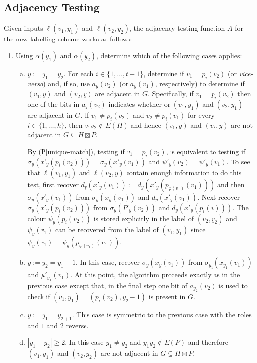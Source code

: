\documentclass{patmorin}
\newcommand{\pref}[1]{(P\ref{#1})}
\begin{document}
\subsection{Adjacency Testing}

Given inputs $\ell(v_1,y_1)$ and $\ell(v_2,y_2)$, the adjacency testing function $A$ for the new labelling scheme works as follows:
\begin{enumerate}
    \item Using $\alpha(y_1)$ and $\alpha(y_2)$, determine which of the following cases applies:
    \begin{enumerate}[(a)]
        \item $y:=y_1=y_2$.  For each $i\in\{1,\ldots,t+1\}$, determine if $v_1=p_i(v_2)$ (or \textit{vice-versa}) and, if so, use $a_y(v_2)$ (or $a_y(v_1)$, respectively) to determine if $(v_1,y)$ and $(v_2,y)$ are adjacent in $G$. Specifically, if $v_1=p_i(v_2)$ then one of the bits in $a_y(v_2)$ indicates whether or $(v_1,y_1)$ and $(v_2,y_1)$ are adjacent in $G$. If $v_1\neq p_i(v_2)$ and $v_2\neq p_i(v_1)$ for every $i\in\{1,\ldots,h\}$, then $v_1v_2\not\in E(H)$ and hence $(v_1,y)$ and $(v_2,y)$ are not adjacent in $G\subseteq H\boxtimes P$.

        By \pref{unique-match}, testing if $v_1=p_i(v_2)$, is equivalent to testing if $\sigma_y(x'_y(p_i(v_2)))=\sigma_y(x'_y(v_1))$ and $\psi'_y(v_2)=\psi'_y(v_1)$.  To see that $\ell(v_1,y_1)$ and $\ell(v_2,y)$ contain enough information to do this test, first recover
        $d_y(x'_y(v_1)):=d_y(x'_y(p_{\varphi(v_1)}(v_1)))$ and then  $\sigma_y(x'_y(v_1))$ from $\sigma_y(x_y(v_1))$ and $d_y(x'_y(v_1))$.
        Next recover $\sigma_y(x'_y(p_i(v_2)))$ from $\sigma_y(P'_y(v_2))$ and $d_y(x'_y(p_i(v)))$.   The colour $\psi_y(p_i(v_2))$ is stored explicitly in the label of $(v_2,y_2)$ and $\psi_y(v_1)$ can be recovered from the label of $(v_1,y_1)$ since $\psi_y(v_1)=\psi_y(p_{\varphi(v_1)}(v_1))$.

        \item $y:=y_2=y_1+1$.  In this case, recover $\sigma_y(x_y(v_1))$ from $\sigma_{y_1}(x_{y_1}(v_1))$ and $\mu'_{y_1}(v_1)$.  At this point, the algorithm proceeds exactly as in the previous case except that, in the final step one bit of $a_{y_2}(v_2)$ is used to check if $(v_1,y_1)=(p_i(v_2),y_2-1)$ is present in $G$.

        \item $y:=y_1=y_{2+1}$. This case is symmetric to the previous case with the roles and $1$ and $2$ reverse.

        \item $|y_1-y_2|\ge 2$.  In this case $y_1\neq y_2$ and $y_1y_2\not\in E(P)$ and therefore $(v_1,y_1)$ and $(v_2,y_2)$ are not adjacent in $G\subseteq H\boxtimes P$.
    \end{enumerate}
\end{enumerate}
\end{document}
